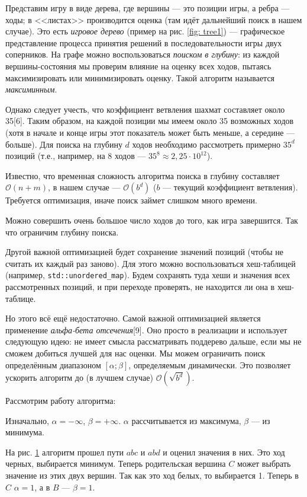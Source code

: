 {   	Представим игру в виде дерева, где вершины --- это позиции игры, а ребра --- ходы; в <<листах>> производится оценка (там идёт дальнейший поиск в нашем случае). Это есть \textit{игровое дерево} (пример на рис. \ref{fig: tree1}) --- графическое представление процесса принятия решений в последовательности игры двух соперников. На графе можно воспользоваться \textit{поиском в глубину}: из каждой вершины-состояния мы проверим влияние на оценку всех ходов, пытаясь максимизировать или минимизировать оценку. Такой алгоритм называется \textit{максиминным}. 
   	
	
	Однако следует учесть, что коэффициент ветвления шахмат составляет около 35[6]. Таким образом, на каждой позиции мы имеем около 35 возможных ходов (хотя в начале и конце игры этот показатель может быть меньше, а середине --- больше). Для поиска на глубину $d$ ходов необходимо рассмотреть примерно $35^{d}$ позиций (т.е., например, на $8$ ходов --- $35^{8} \approx 2,25\cdot10^{12}$).
	
	Известно, что временная сложность алгоритма поиска в глубину составляет $\mathcal{O}(n+m)$, в нашем случае --- $\mathcal{O}(b^{d})$ ($b$ --- текущий коэффициент ветвления). Требуется оптимизация, иначе поиск займет слишком много времени.
	
	Можно совершить очень большое число ходов до того, как игра завершится. Так что ограничим глубину поиска.
	
	Другой важной оптимизацией будет сохранение значений позиций (чтобы не считать их каждый раз заново). Для этого можно воспользоваться хеш-таблицей (например, \texttt{std::unordered\_map}). Будем сохранять туда хеши и значения всех рассмотренных позиций, и при переходе проверять, не находится ли она в хеш-таблице.
	
	Но этого всё ещё недостаточно. Самой важной оптимизацией является применение \textit{альфа-бета отсечения}[9]. Оно просто в реализации и использует следующую идею: не имеет смысла рассматривать поддерево дальше, если мы не сможем добиться лучшей для нас оценки. Мы можем ограничить поиск определённым диапазоном $[\alpha;\beta]$, определяемым динамически. Это позволяет ускорить алгоритм до (в лучшем случае) $\mathcal{O}(\sqrt{b^{d}})$.
	
	Рассмотрим работу алгоритма:
	
	Изначально, $\alpha=-\infty$, $\beta=+\infty$. $\alpha$ рассчитывается из максимума, $\beta$ --- из минимума.
	
	На рис. \ref{fig: tree2} алгоритм прошел пути $abc$ и $abd$ и оценил значения в них. Это ход черных, выбирается минимум. Теперь родительская вершина $C$ может выбрать значение из этих двух вершин. Так как это ход белых, то выбирается 1. Теперь в $C$ $\alpha=1$, а в $B$ --- $\beta=1$.
	\begin{figure}[h]
		\centering
		\caption{}
		\label{fig: tree2}
		

\end{figure}}
